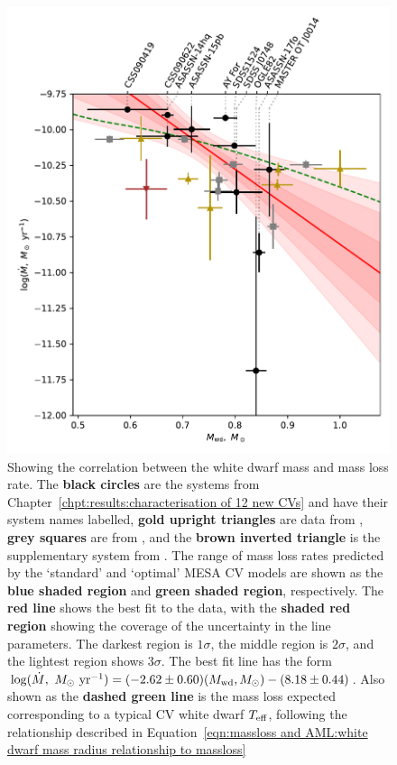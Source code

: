 \begin{figure}
    \centering
    \includegraphics[width=\textwidth]{figures/results/Mdot/Mwd_Mdot.pdf}
    \caption{Showing the correlation between the white dwarf mass and mass loss rate. The {\bf black circles} are the systems from Chapter~\ref{chpt:results:characterisation of 12 new CVs} and have their system names labelled, {\bf gold upright triangles} are data from \citet{McAllister2019}, {\bf grey squares} are from \citet{Savoury2011}, and the {\bf brown inverted triangle} is the supplementary system from \citet{mcallister2017b}. The range of mass loss rates predicted by the `standard' and `optimal' MESA CV models are shown as the {\bf blue shaded region} and {\bf green shaded region}, respectively. The {\bf red line} shows the best fit to the data, with the {\bf shaded red region} showing the coverage of the uncertainty in the line parameters. The darkest region is $1\sigma$, the middle region is $2\sigma$, and the lightest region shows $3\sigma$. The best fit line has the form $\log ( \dot M,\ M_\odot\ {\rm yr}^{-1}) = (-2.62 \pm 0.60) (M_{\rm wd}, M_\odot) - (8.18 \pm 0.44)$. Also shown as the {\bf dashed green line} is the mass loss expected corresponding to a typical CV white dwarf $T_{\rm eff}$, following the relationship described in Equation~\ref{eqn:massloss and AML:white dwarf mass radius relationship to massloss}}
    \label{fig:massloss and AML:white dwarf mass vs Mdot fit}
\end{figure}
